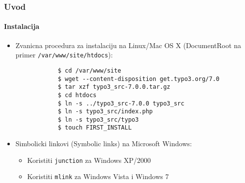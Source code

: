\begin{frame}[fragile]
	\frametitle{Uvod}
	\framesubtitle{Instalacija}

	\begin{itemize}
		\item Zvanicna procedura za instalaciju na Linux/Mac OS X \newline
			(DocumentRoot na primer \texttt{/var/www/site/htdocs}):
		\begin{lstlisting}
			$ cd /var/www/site
			$ wget --content-disposition get.typo3.org/7.0
			$ tar xzf typo3_src-7.0.0.tar.gz
			$ cd htdocs
			$ ln -s ../typo3_src-7.0.0 typo3_src
			$ ln -s typo3_src/index.php
			$ ln -s typo3_src/typo3
			$ touch FIRST_INSTALL
		\end{lstlisting}

		\item Simbolicki linkovi (Symbolic links) na Microsoft Windows:

			\begin{itemize}
				\item Koristiti  \texttt{junction} za Windows XP/2000
				\item Koristiti  \texttt{mlink} za Windows Vista i Windows 7
			\end{itemize}

	\end{itemize}
\end{frame}


